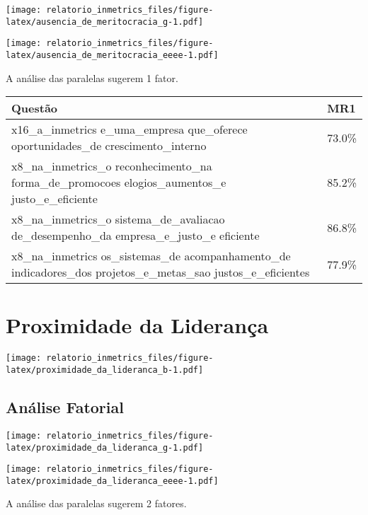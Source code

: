 \documentclass[]{book}
\begin{document}
\texttt{[image: relatorio\_inmetrics\_files/figure-latex/ausencia\_de\_meritocracia\_g-1.pdf]}

\texttt{[image: relatorio\_inmetrics\_files/figure-latex/ausencia\_de\_meritocracia\_eeee-1.pdf]}

A análise das paralelas sugerem 1 fator.

\begin{table}[H]
\centering\begingroup\fontsize{12}{14}\selectfont

\begin{tabular}{>{\raggedright\arraybackslash}p{20em}l}
\toprule
Questão & MR1\\
\midrule
x16\_a\_inmetrics
e\_uma\_empresa
que\_oferece
oportunidades\_de
crescimento\_interno & 73.0\%\\
x8\_na\_inmetrics\_o
reconhecimento\_na
forma\_de\_promocoes
elogios\_aumentos\_e
justo\_e\_eficiente & 85.2\%\\
x8\_na\_inmetrics\_o
sistema\_de\_avaliacao
de\_desempenho\_da
empresa\_e\_justo\_e
eficiente & 86.8\%\\
x8\_na\_inmetrics
os\_sistemas\_de
acompanhamento\_de
indicadores\_dos
projetos\_e\_metas\_sao
justos\_e\_eficientes & 77.9\%\\
\bottomrule
\end{tabular}
\endgroup{}
\end{table}

\hypertarget{proximidade-da-lideranca}{%
\section{Proximidade da Liderança}\label{proximidade-da-lideranca}}

\texttt{[image: relatorio\_inmetrics\_files/figure-latex/proximidade\_da\_lideranca\_b-1.pdf]}

\hypertarget{analise-fatorial-6}{%
\subsection{Análise Fatorial}\label{analise-fatorial-6}}

\texttt{[image: relatorio\_inmetrics\_files/figure-latex/proximidade\_da\_lideranca\_g-1.pdf]}

\texttt{[image: relatorio\_inmetrics\_files/figure-latex/proximidade\_da\_lideranca\_eeee-1.pdf]}

A análise das paralelas sugerem 2 fatores.
\end{document}
